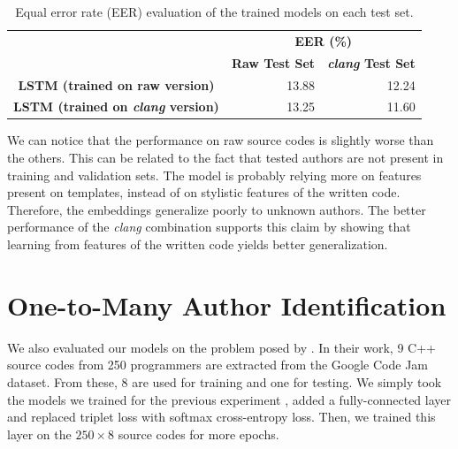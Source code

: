 \begin{table}[ht]
	\centering
	\begin{tabular}{ccr}
		\cline{2-3}
		\multicolumn{1}{l}{}                     & \multicolumn{2}{c}{\textbf{EER (\%)}}                                   \\ \cline{2-3} 
		\textbf{}                                & \textbf{Raw Test Set}     & \multicolumn{1}{l}{\textbf{\textit{clang} Test Set}} \\ \hline
		
		
		\textbf{LSTM (trained on raw version)}   & \multicolumn{1}{r}{13.88} & 12.24                                       \\ \hline
		\textbf{LSTM (trained on \textit{clang} version)} & \multicolumn{1}{r}{13.25} & 11.60                                        \\ \hline
	\end{tabular}
	\caption{Equal error rate (EER) evaluation of the trained models on each test set.}
	\label{tab:matching}
\end{table}

We can notice that the performance on raw source codes is slightly worse than the others. This can be related to the fact that tested authors are not present in training and validation sets. The model is probably relying more on features present on templates, instead of on stylistic features of the written code. Therefore, the embeddings generalize poorly to unknown authors. The better performance of the \textit{clang} combination supports this claim by showing that learning from features of the written code yields better generalization.

\section{One-to-Many Author Identification}\label{sec:one_to_many}

We also evaluated our models on the problem posed by . In their work, 9 C++ source codes from 250 programmers are extracted from the Google Code Jam dataset. From these, 8 are used for training and one for testing. We simply took the models we trained for the previous experiment , added a fully-connected layer and replaced triplet loss with softmax cross-entropy loss. Then, we trained this layer on the $250 \times 8$ source codes for more epochs.

